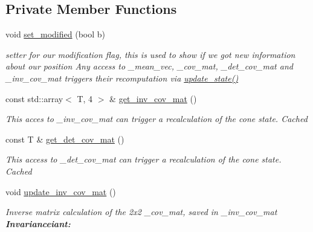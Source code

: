 \subsection*{Private Member Functions}
\begin{DoxyCompactItemize}
\item 
\mbox{\label{classclara_1_1cone__state_ac9712fb4aee53df62da1cd320a45f813}} 
void \hyperlink{classclara_1_1cone__state_ac9712fb4aee53df62da1cd320a45f813}{set\+\_\+modified} (bool b)
\begin{DoxyCompactList}\small\item\em setter for our modification flag, this is used to show if we got new information about our position Any access to {\ttfamily \+\_\+mean\+\_\+vec}, {\ttfamily \+\_\+cov\+\_\+mat}, {\ttfamily \+\_\+det\+\_\+cov\+\_\+mat} and {\ttfamily \+\_\+inv\+\_\+cov\+\_\+mat} triggers their recomputation via {\ttfamily \hyperlink{classclara_1_1cone__state_a8cb6454f6a731f69d3e85382b0ae40b4}{update\+\_\+state()}} \end{DoxyCompactList}\item 
const std\+::array$<$ T, 4 $>$ \& \hyperlink{classclara_1_1cone__state_a7a0584b86ba125a2c232f26d4d1e4a38}{get\+\_\+inv\+\_\+cov\+\_\+mat} ()
\begin{DoxyCompactList}\small\item\em This acces to {\ttfamily \+\_\+inv\+\_\+cov\+\_\+mat} can trigger a recalculation of the cone state. {\itshape Cached} \end{DoxyCompactList}\item 
\mbox{\label{classclara_1_1cone__state_a5775993f75df93a3121c1fb53ef48777}} 
const T \& \hyperlink{classclara_1_1cone__state_a5775993f75df93a3121c1fb53ef48777}{get\+\_\+det\+\_\+cov\+\_\+mat} ()
\begin{DoxyCompactList}\small\item\em This access to {\ttfamily \+\_\+det\+\_\+cov\+\_\+mat} can trigger a recalculation of the cone state. {\itshape Cached} \end{DoxyCompactList}\item 
void \hyperlink{classclara_1_1cone__state_a7b0d6ab972d3d003eaad439c630c1c73}{update\+\_\+inv\+\_\+cov\+\_\+mat} ()
\begin{DoxyCompactList}\small\item\em Inverse matrix calculation of the 2x2 {\ttfamily \+\_\+cov\+\_\+mat}, saved in {\ttfamily \+\_\+inv\+\_\+cov\+\_\+mat} {\bfseries Invarianceiant\+:} \end{DoxyCompactList}\item 

\end{DoxyCompactItemize}
